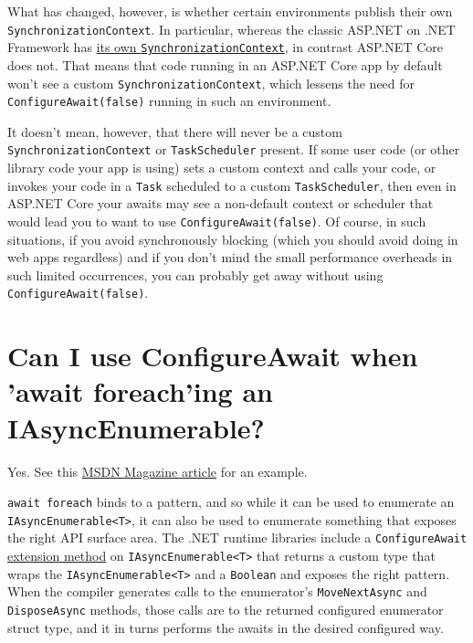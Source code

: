 \documentclass[a4paper,12pt,notitlepage,twoside,openright]{article}
\begin{document}
What has changed, however, is whether certain environments publish their
own \texttt{SynchronizationContext}. In particular, whereas the classic
ASP.NET on .NET Framework has
\href{https://github.com/microsoft/referencesource/blob/3b1eaf5203992df69de44c783a3eda37d3d4cd10/System.Web/AspNetSynchronizationContextBase.cs}{its
own \texttt{SynchronizationContext}}, in contrast ASP.NET Core does not.
That means that code running in an ASP.NET Core app by default won't see
a custom \texttt{SynchronizationContext}, which lessens the need for
\texttt{ConfigureAwait(false)} running in such an environment.

It doesn't mean, however, that there will never be a custom
\texttt{SynchronizationContext} or \texttt{TaskScheduler} present. If
some user code (or other library code your app is using) sets a custom
context and calls your code, or invokes your code in a \texttt{Task}
scheduled to a custom \texttt{TaskScheduler}, then even in ASP.NET Core
your awaits may see a non-default context or scheduler that would lead
you to want to use \texttt{ConfigureAwait(false)}. Of course, in such
situations, if you avoid synchronously blocking (which you should avoid
doing in web apps regardless) and if you don't mind the small
performance overheads in such limited occurrences, you can probably get
away without using \texttt{ConfigureAwait(false)}.

\hypertarget{can-i-use-configureawait-when-await-foreaching-an-iasyncenumerable}{%
\section{Can I use ConfigureAwait when 'await foreach'ing an
IAsyncEnumerable?}\label{can-i-use-configureawait-when-await-foreaching-an-iasyncenumerable}}

Yes. See this
\href{https://docs.microsoft.com/en-us/archive/msdn-magazine/2019/november/csharp-iterating-with-async-enumerables-in-csharp-8}{MSDN
Magazine article} for an example.

\texttt{await\ foreach} binds to a pattern, and so while it can be used
to enumerate an \texttt{IAsyncEnumerable\textless{}T\textgreater{}}, it
can also be used to enumerate something that exposes the right API
surface area. The .NET runtime libraries include a
\texttt{ConfigureAwait}
\href{https://github.com/dotnet/runtime/blob/91a717450bf5faa44d9295c01f4204dc5010e95c/src/libraries/System.Private.CoreLib/src/System/Threading/Tasks/TaskAsyncEnumerableExtensions.cs\#L25-L26}{extension
method} on \texttt{IAsyncEnumerable\textless{}T\textgreater{}} that
returns a custom type that wraps the
\texttt{IAsyncEnumerable\textless{}T\textgreater{}} and a
\texttt{Boolean} and exposes the right pattern. When the compiler
generates calls to the enumerator's \texttt{MoveNextAsync} and
\texttt{DisposeAsync} methods, those calls are to the returned
configured enumerator struct type, and it in turns performs the awaits
in the desired configured way.
\end{document}
